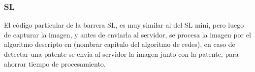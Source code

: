 \subsubsection{SL}

El código particular de la barrera SL, es muy similar al del SL mini, pero luego de capturar la imagen, y antes de enviarla al servidor, se procesa la imagen por el algoritmo descripto en (nombrar capitulo del algoritmo de redes), en caso de detectar una patente se envia al servidor la imagen junto con la patente, para ahorrar tiempo de procesamiento.


